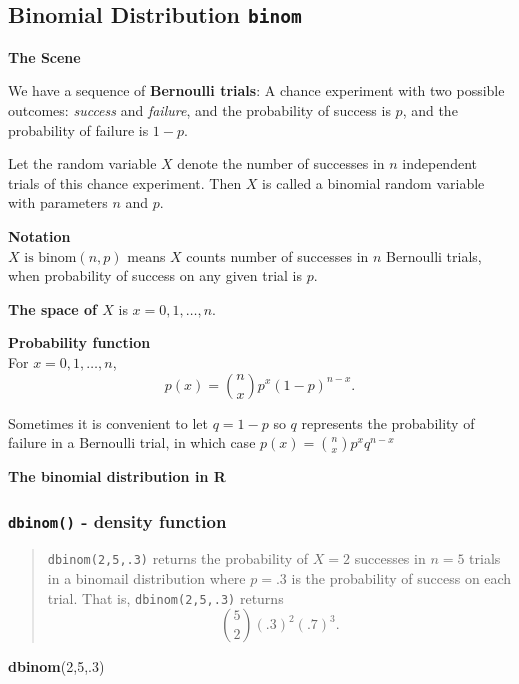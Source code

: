 \documentclass[
]{book}
\newenvironment{Shaded}{\begin{snugshade}}{\end{snugshade}}
\newcommand{\DecValTok}[1]{\textcolor[rgb]{0.00,0.00,0.81}{#1}}
\newcommand{\FunctionTok}[1]{\textcolor[rgb]{0.13,0.29,0.53}{\textbf{#1}}}
\newcommand{\NormalTok}[1]{#1}
\theoremstyle{definition}
\theoremstyle{definition}
\theoremstyle{definition}
\theoremstyle{definition}
\theoremstyle{remark}
\begin{document}
\subsection{\texorpdfstring{Binomial Distribution \texttt{binom}}{Binomial Distribution binom}}\label{binomial-distribution-binom}

\textbf{The Scene}

We have a sequence of \textbf{Bernoulli trials}: A chance experiment with two possible outcomes: \emph{success} and \emph{failure}, and the probability of success is \(p\), and the probability of failure is \(1-p\).

Let the random variable \(X\) denote the number of successes in \(n\) independent trials of this chance experiment. Then \(X\) is called a binomial random variable with parameters \(n\) and \(p\).

\textbf{Notation}\\
\(X \text{ is binom}(n,p)\) means \(X\) counts number of successes in \(n\) Bernoulli trials, when probability of success on any given trial is \(p\).

\textbf{The space of \(X\)} is \(x = 0, 1, \ldots, n\).

\textbf{Probability function}\\
For \(x = 0, 1, \ldots, n\), \[p(x)=\binom{n}{x}p^x(1-p)^{n-x}.\]

Sometimes it is convenient to let \(q = 1-p\) so \(q\) represents the probability of failure in a Bernoulli trial, in which case \(p(x) = \binom{n}{x}p^xq^{n-x}\)

\textbf{The binomial distribution in R}

\subsubsection{\texorpdfstring{\texttt{dbinom()} - density function}{dbinom() - density function}}\label{dbinom---density-function}

\begin{quote}
\texttt{dbinom(2,5,.3)} returns the probability of \(X=2\) successes in \(n=5\) trials in a binomail distribution where \(p = .3\) is the probability of success on each trial. That is, \texttt{dbinom(2,5,.3)} returns \[\binom{5}{2}(.3)^2(.7)^3.\]
\end{quote}

\begin{Shaded}
\begin{Highlighting}[]
\FunctionTok{dbinom}\NormalTok{(}\DecValTok{2}\NormalTok{,}\DecValTok{5}\NormalTok{,.}\DecValTok{3}\NormalTok{)}
\end{Highlighting}
\end{Shaded}
\end{document}
